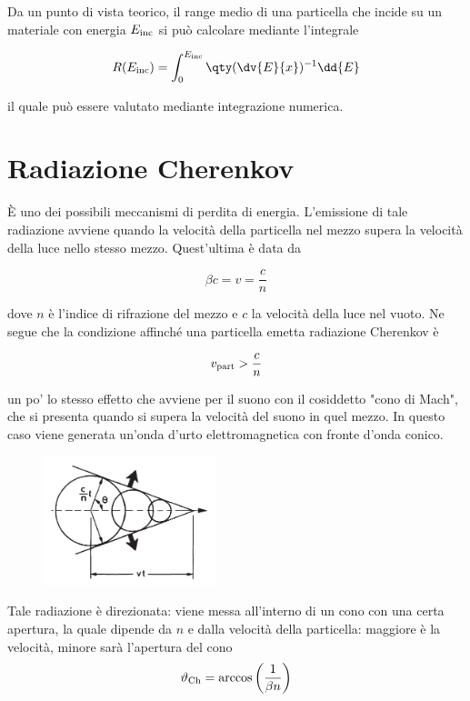 Da un punto di vista teorico, il range medio di una particella che incide su un materiale con energia $E_{\rm inc}$ si può calcolare mediante l'integrale

\begin{equation*}
    R(E_{\rm inc})=\int_{0}^{E_{\rm inc}} \qty( \dv{E}{x} )^{-1} \dd{E}
\end{equation*}

il quale può essere valutato mediante integrazione numerica.

\section{Radiazione Cherenkov}

È uno dei possibili meccanismi di perdita di energia. L'emissione di tale radiazione avviene quando la velocità della particella nel mezzo supera la velocità della luce nello stesso mezzo. Quest'ultima è data da

\begin{equation*}
    \beta c=v=\frac{c}{n}
\end{equation*}

dove $n$ è l'indice di rifrazione del mezzo e $c$ la velocità della luce nel vuoto. Ne segue che la condizione affinché una particella emetta radiazione Cherenkov è

\begin{equation*}
    v_{\rm part} > \frac{c}{n}
\end{equation*}

\E un po' lo stesso effetto che avviene per il suono con il cosiddetto "cono di Mach", che si presenta quando si supera la velocità del suono in quel mezzo. In questo caso viene generata un'onda d'urto elettromagnetica con fronte d'onda conico.

\begin{minipage}{0.395\textwidth}
    \begin{figure}[H]
        \centering
        \includegraphics[width=5cm]{immagini/Effetto_Cherenkov.png}
    \end{figure}
\end{minipage}
\begin{minipage}{0.6\textwidth}
    \vspace{0.6cm}Tale radiazione è direzionata: viene messa all'interno di un cono con una certa apertura, la quale dipende da $n$ e dalla velocità della particella: maggiore è la velocità, minore sarà l'apertura del cono
    \begin{equation*}
        \vartheta_{\rm Ch}
        =\arccos{\left(\frac{1}{\beta n}\right)}
    \end{equation*}
\end{minipage}

